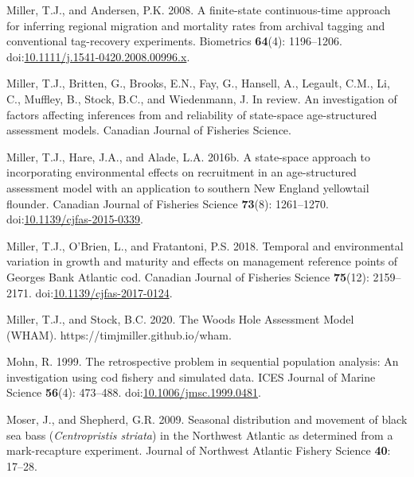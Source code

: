 \documentclass[
]{article}
\newlength{\cslhangindent}
\newlength{\cslentryspacingunit} %
\newenvironment{CSLReferences}[2] %
 {%
  \setlength{\parindent}{0pt}
  \ifodd #1
  \let\oldpar\par
  \def\par{\hangindent=\cslhangindent\oldpar}
  \fi
  \setlength{\parskip}{#2\cslentryspacingunit}
 }%
 {}
\begin{document}
\begin{CSLReferences}{1}{0}
\leavevmode{}%
Miller, T.J., and Andersen, P.K. 2008. A finite-state continuous-time approach for inferring regional migration and mortality rates from archival tagging and conventional tag-recovery experiments. Biometrics \textbf{64}(4): 1196--1206. doi:\href{https://doi.org/10.1111/j.1541-0420.2008.00996.x}{10.1111/j.1541-0420.2008.00996.x}.

\leavevmode{}%
Miller, T.J., Britten, G., Brooks, E.N., Fay, G., Hansell, A., Legault, C.M., Li, C., Muffley, B., Stock, B.C., and Wiedenmann, J. In review. An investigation of factors affecting inferences from and reliability of state-space age-structured assessment models. Canadian Journal of Fisheries Science.

\leavevmode{}%
Miller, T.J., Hare, J.A., and Alade, L.A. 2016b. A state-space approach to incorporating environmental effects on recruitment in an age-structured assessment model with an application to southern {New England} yellowtail flounder. Canadian Journal of Fisheries Science \textbf{73}(8): 1261--1270. doi:\href{https://doi.org/10.1139/cjfas-2015-0339}{10.1139/cjfas-2015-0339}.

\leavevmode{}%
Miller, T.J., O'Brien, L., and Fratantoni, P.S. 2018. Temporal and environmental variation in growth and maturity and effects on management reference points of {Georges Bank Atlantic} cod. Canadian Journal of Fisheries Science \textbf{75}(12): 2159--2171. doi:\href{https://doi.org/10.1139/cjfas-2017-0124}{10.1139/cjfas-2017-0124}.

\leavevmode{}%
Miller, T.J., and Stock, B.C. 2020. The {Woods Hole Assessment Model} ({WHAM}). https://timjmiller.github.io/wham.

\leavevmode{}%
Mohn, R. 1999. The retrospective problem in sequential population analysis: An investigation using cod fishery and simulated data. ICES Journal of Marine Science \textbf{56}(4): 473--488. doi:\href{https://doi.org/10.1006/jmsc.1999.0481}{10.1006/jmsc.1999.0481}.

\leavevmode{}%
Moser, J., and Shepherd, G.R. 2009. Seasonal distribution and movement of black sea bass (\emph{{C}entropristis striata}) in the {N}orthwest {A}tlantic as determined from a mark-recapture experiment. Journal of Northwest Atlantic Fishery Science \textbf{40}: 17--28.


\end{CSLReferences}
\end{document}
